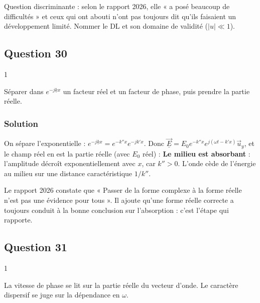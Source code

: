 \documentclass[11pt,a4paper]{article}
\newcommand{\equationajustee}[1]{%
  \sbox{\boiteequation}{$\displaystyle #1$}%
  \ifdim\wd\boiteequation>\linewidth
    \[\resizebox{\linewidth}{!}{\usebox{\boiteequation}}\]%
  \else
    \[#1\]%
  \fi}
\begin{document}
\begin{jury}

Question discriminante : selon le rapport 2026, elle « a posé beaucoup de difficultés » et ceux qui ont abouti n'ont pas toujours dit qu'ils faisaient un développement limité. Nommer le DL et son domaine de validité (\(|u|\ll1\)).

\end{jury}

\hypertarget{question-30}{%
\subsection{Question 30}\label{question-30}}

\begin{indication}{1}

Séparer dans \(e^{-j\underline kx}\) un facteur réel et un facteur de phase, puis prendre la partie réelle.

\end{indication}

\hypertarget{solution-29}{%
\subsubsection{Solution}\label{solution-29}}

On sépare l'exponentielle : \(e^{-j\underline kx}=e^{-k''x}e^{-jk'x}\). Donc \(\underline{\vec E}=E_0e^{-k''x}e^{j(\omega t-k'x)}\vec u_y\), et le champ réel en est la partie réelle (avec \(E_0\) réel) :
\equationajustee{\boxed{\vec E(x,t)=E_0e^{-k''x}\cos(\omega t-k'x)\vec u_y}}
\textbf{Le milieu est absorbant} : l'amplitude décroît exponentiellement avec \(x\), car \(k''>0\). L'onde cède de l'énergie au milieu sur une distance caractéristique \(1/k''\).

\begin{jury}

Le rapport 2026 constate que « Passer de la forme complexe à la forme réelle n'est pas une évidence pour tous ». Il ajoute qu'une forme réelle correcte a toujours conduit à la bonne conclusion sur l'absorption : c'est l'étape qui rapporte.

\end{jury}

\hypertarget{question-31}{%
\subsection{Question 31}\label{question-31}}

\begin{indication}{1}

La vitesse de phase se lit sur la partie réelle du vecteur d'onde. Le caractère dispersif se juge sur la dépendance en \(\omega\).

\end{indication}
\end{document}
